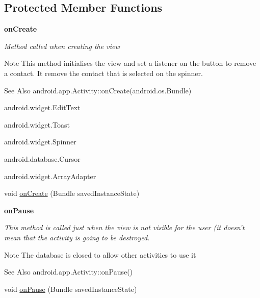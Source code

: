 \subsection*{Protected Member Functions}
\begin{Indent}{\bf on\-Create}\par
{\em Method called when creating the view

\begin{DoxyNote}{Note}
This method initialises the view and set a listener on the button to remove a contact. It remove the contact that is selected on the spinner. 
\end{DoxyNote}
\begin{DoxySeeAlso}{See Also}
android.\-app.\-Activity\-::on\-Create(android.\-os.\-Bundle) 

android.\-widget.\-Edit\-Text 

android.\-widget.\-Toast 

android.\-widget.\-Spinner 

android.\-database.\-Cursor 

android.\-widget.\-Array\-Adapter 
\end{DoxySeeAlso}
}\begin{DoxyCompactItemize}
\item 
void \hyperlink{classnpi_1_1practicaandroid_1_1tutorialnpi_1_1_remove_contact_a5fa2f9ff421a550db9a5094e35825ea5}{on\-Create} (Bundle saved\-Instance\-State)
\end{DoxyCompactItemize}
\end{Indent}
\begin{Indent}{\bf on\-Pause}\par
{\em This method is called just when the view is not visible for the user (it doesn't mean that the activity is going to be destroyed.

\begin{DoxyNote}{Note}
The database is closed to allow other activities to use it
\end{DoxyNote}
\begin{DoxySeeAlso}{See Also}
android.\-app.\-Activity\-::on\-Pause() 
\end{DoxySeeAlso}
}\begin{DoxyCompactItemize}
\item 
void \hyperlink{classnpi_1_1practicaandroid_1_1tutorialnpi_1_1_remove_contact_ab31d24d20e08ac4027c99b7bf36de23e}{on\-Pause} (Bundle saved\-Instance\-State)
\end{DoxyCompactItemize}
\end{Indent}
